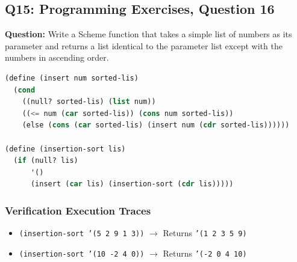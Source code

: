 \documentclass[11pt]{article}
\begin{document}
\subsection{Q15: Programming Exercises, Question 16}
\textbf{Question:} Write a Scheme function that takes a simple list of numbers as its parameter and returns a list identical to the parameter list except with the numbers in ascending order.

\begin{lstlisting}[language=Lisp]
(define (insert num sorted-lis)
  (cond
    ((null? sorted-lis) (list num))
    ((<= num (car sorted-lis)) (cons num sorted-lis))
    (else (cons (car sorted-lis) (insert num (cdr sorted-lis))))))

(define (insertion-sort lis)
  (if (null? lis)
      '()
      (insert (car lis) (insertion-sort (cdr lis)))))
\end{lstlisting}

\subsubsection*{Verification Execution Traces}
\begin{itemize}
    \item \texttt{(insertion-sort '(5 2 9 1 3))} $\rightarrow$ Returns \texttt{'(1 2 3 5 9)}
    \item \texttt{(insertion-sort '(10 -2 4 0))} $\rightarrow$ Returns \texttt{'(-2 0 4 10)}
\end{itemize}
\end{document}
